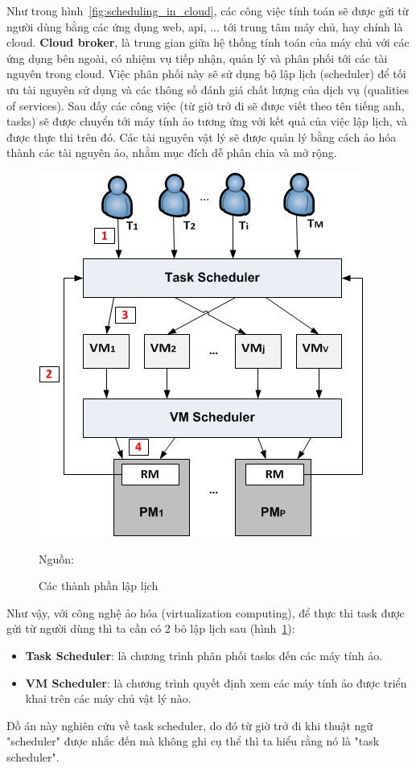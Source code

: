 \documentclass{my_style}
\newcommand{\source}[1]{\caption*{Nguồn: {#1}} }
\begin{document}
Như trong hình~\ref{fig:scheduling_in_cloud}, các công việc tính toán sẽ được gửi từ người dùng bằng các ứng dụng web, api, ... tới trung tâm máy chủ, hay chính là cloud. \textbf{Cloud broker}, là trung gian giữa hệ thống tính toán của máy chủ với các ứng dụng bên ngoài, có nhiệm vụ tiếp nhận, quản lý và phân phối tới các tài nguyên trong cloud. Việc phân phối này sẽ sử dụng bộ lập lịch (scheduler) để tối ưu tài nguyên sử dụng và các thông số đánh giá chất lượng của dịch vụ (qualities of services). Sau đấy các công việc (từ giờ trở đi sẽ được viết theo tên tiếng anh, tasks) sẽ được chuyển tới máy tính ảo tương ứng với kết quả của việc lập lịch, và được thực thi trên đó. Các tài nguyên vật lý sẽ được quản lý bằng cách ảo hóa thành các tài nguyên ảo, nhằm mục đích dễ phân chia và mở rộng.
\begin{figure}[h!]
	\centering
	\includegraphics[scale=0.5]{images/scheduling_types.jpg}
	\caption{Các thành phần lập lịch}
	\label{fig:2}
	\source{\cite{34}}
\end{figure}
Như vậy, với công nghệ ảo hóa (virtualization computing), để thực thi task được gửi từ người dùng thì ta cần có 2 bô lập lịch sau (hình~\ref{fig:2}): 
\begin{itemize}
	\item \textbf{Task Scheduler}: là chương trình phân phối tasks đến các máy tính ảo.
	\item \textbf{VM Scheduler}: là chương trình quyết định xem các máy tính ảo được triển khai trên các máy chủ vật lý nào.
\end{itemize}
Đồ án này nghiên cứu về task scheduler, do đó từ giờ trở đi khi thuật ngữ "scheduler" được nhắc đến mà không ghi cụ thể thì ta hiểu rằng nó là "task scheduler".
\end{document}
